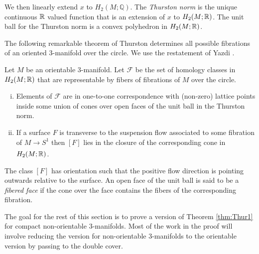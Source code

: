 We then linearly extend $x$ to $H_2(M;\mathbb{Q})$.  The \emph{Thurston norm} is the unique continuous $\mathbb{R}$ valued function that is an extension of $x$ to $H_2(M;\mathbb{R})$.
The unit ball for the Thurston norm is a convex polyhedron in $H_2(M;\mathbb{R})$.%


The following remarkable theorem of Thurston \cite{thurston1986norm} determines all possible fibrations of an oriented 3-manifold over the circle.
We use the restatement of Yazdi \cite{yazdi2018pseudo}.
\begin{thm}[Thurston]
  \label{thm:Thur1}
  Let $M$ be an orientable 3-manifold.  Let $\mathcal{F}$ be the set of homology classes in $H_2(M; \mathbb{R})$ that are representable by fibers of fibrations of $M$ over the circle.
\begin{enumerate}[(i)]
\item Elements of $\mathcal{F}$ are in one-to-one correspondence with (non-zero) lattice points inside some union of cones over open faces of the unit ball in the Thurston norm.
\item If a surface $F$ is transverse to the suspension flow associated to some fibration of
  $M \xrightarrow[]{} S^1$ then $[F]$ lies in the closure of the corresponding cone in $H_2(M;\mathbb{R})$.
\end{enumerate}
\end{thm}
The class $[F]$ has orientation such that the positive flow direction is pointing outwards relative to the surface.
An open face of the unit ball is said to be a \emph{fibered face} if the cone over the face contains the fibers of the corresponding fibration.

The goal for the rest of this section is to prove a version of Theorem \ref{thm:Thur1} for compact non-orientable $3$-manifolds.
Most of the work in the proof will involve reducing the version for non-orientable $3$-manifolds to the orientable version by passing to the double cover.

